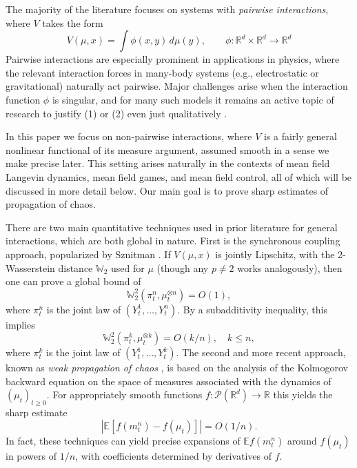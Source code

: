 \documentclass[11pt,reqno]{amsart}
\numberwithin{equation}{section}
\theoremstyle{definition}
\def\E{{\mathbb E}}
\def\R{{\mathbb R}}
\newcommand{\W}{\mathbb W}
\begin{document}
The majority of the literature focuses on systems with \emph{pairwise interactions}, where $ V$ takes the form
\begin{equation}
 V(\mu,x)=\int \phi(x,y)\,d\mu(y), \qquad \phi : \R^d \times \R^d \to \R^d \label{intro:pairwise}
\end{equation}
Pairwise interactions are especially prominent in applications in physics, where the relevant interaction forces in many-body systems (e.g., electrostatic or gravitational) naturally act pairwise.
Major challenges arise when the interaction function $\phi$ is singular, and for many such models it remains an active topic of research to justify (1) or (2) even just qualitatively \cite{JabinWangReview}.
 
In this paper we focus on non-pairwise interactions, where $ V$ is a fairly general nonlinear functional of its measure argument, assumed smooth in a sense we make precise later. This setting arises naturally in the contexts of mean field Langevin dynamics, mean field games, and mean field control, all of which will be discussed in more detail below.
Our main goal is to prove sharp estimates of propagation of chaos.

There are two main quantitative techniques used in prior literature for general interactions, which are both global in nature.
First is the synchronous coupling approach, popularized by Sznitman \cite{snitzmann}. If $ V(\mu,x)$ is jointly Lipschitz, with the 2-Wasserstein distance $\W_2$ used for $\mu$ (though any $p\neq 2$ works analogously), then one can prove a global bound of
\[
\W_2^2(\pi^n_t , \mu^{\otimes n}_t) = O(1),
\]
where $\pi^n_t$ is the joint law of $(Y^1_t,\ldots,Y^n_t)$. By a subadditivity inequality, this implies
\begin{equation}
\W_2^2(\pi^k_t , \mu^{\otimes k}_t) = O(k/n), \quad k \le n, \label{intro:W2-subadditive}
\end{equation}
where $\pi^k_t$ is the joint law of $(Y^1_t,\ldots,Y^k_t)$.
The second and more recent approach, known as \emph{weak propagation of chaos} \cite{Chassagneux2022-jt,UiTWeakChaos}, is based on the analysis of the Kolmogorov backward equation on the space of measures associated with the dynamics of $(\mu_t)_{t \ge 0}$. For appropriately smooth functions $f:\mathcal P(\R^d)\to \R$ this yields the sharp estimate
\begin{equation}
|\E[f(m_t^n)-f(\mu_t)]|= O(1/n). \label{intro:weakPoC}
\end{equation}
In fact, these techniques can yield precise expansions of $\E f(m_t^n)$ around $f(\mu_t)$ in powers of $1/n$, with coefficients determined by derivatives of $f$.
\end{document}
